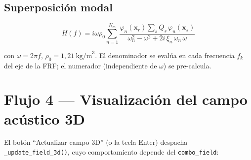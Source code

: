 \documentclass[11pt,a4paper]{article}
\begin{document}
\subsection*{Superposición modal}

\[
  H(f) = i\omega\rho_0 \sum_{n=1}^{N_m}
         \frac{\varphi_n(\mathbf{x}_r)
               \displaystyle\sum_s Q_s\,\varphi_n(\mathbf{x}_s)}
              {\omega_n^2 - \omega^2 + 2i\,\xi_n\,\omega_n\,\omega}
\]

con $\omega = 2\pi f$, $\rho_0 = 1{,}21\ \text{kg/m}^3$.
El denominador se evalúa en cada frecuencia $f_k$ del eje de la FRF;
el numerador (independiente de $\omega$) se pre-calcula.

\section{Flujo 4 — Visualización del campo acústico 3D}

El botón ``Actualizar campo 3D'' (o la tecla Enter) despacha
\texttt{\_update\_field\_3d()}, cuyo comportamiento depende del
\texttt{combo\_field}:
\end{document}
